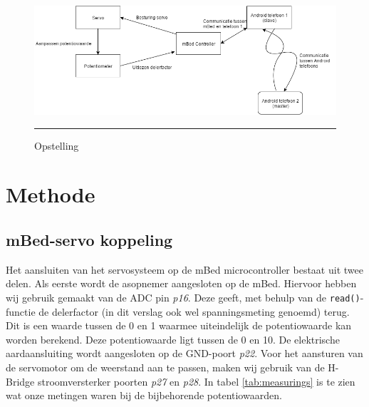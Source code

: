 \documentclass[a4paper,12pt]{article}
\begin{document}
\vspace{1em}
\begin{figure}[!htbp]
\centering
\includegraphics[width=1.2\textwidth]{blokdiagram.png}
\vspace{1ex}
\hrule
\caption{Opstelling}
\label{fig:blokdiagram}
\end{figure}


\section{Methode}

\subsection{mBed-servo koppeling}
Het aansluiten van het servosysteem op de mBed microcontroller bestaat uit twee delen. Als eerste wordt de asopnemer aangesloten op de mBed. Hiervoor hebben wij gebruik gemaakt van de ADC pin \textit{p16}. Deze geeft, met behulp van de \texttt{read()}-functie de delerfactor (in dit verslag ook wel spanningsmeting genoemd) terug. Dit is een waarde tussen de 0 en 1 waarmee uiteindelijk de potentiowaarde kan worden berekend. Deze potentiowaarde ligt tussen de 0 en 10. De elektrische aardaansluiting wordt aangesloten op de GND-poort \textit{p22}. Voor het aansturen van de servomotor om de weerstand aan te passen, maken wij gebruik van de H-Bridge stroomversterker poorten \textit{p27} en \textit{p28}. In tabel \ref{tab:measurings} is te zien wat onze metingen waren bij de bijbehorende potentiowaarden.
\end{document}
